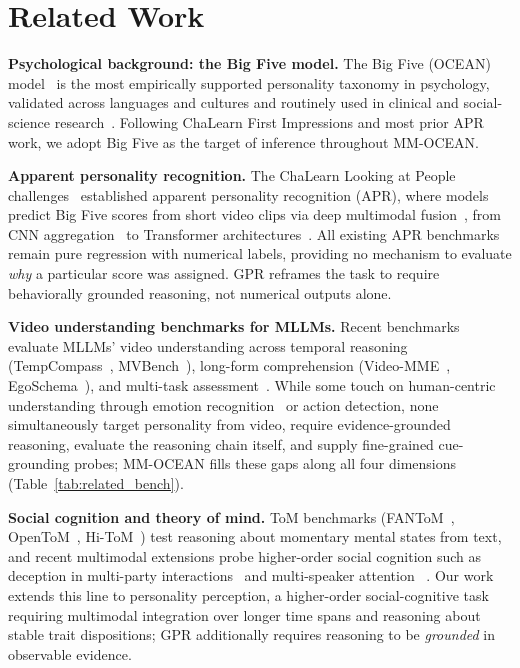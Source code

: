 \documentclass{article}
\newcommand{\taskabbr}{GPR}
\newcommand{\benchname}{MM-OCEAN}
\begin{document}
\vspace{-0.2cm}
\section{Related Work}
\label{sec:related}

\vspace{-0.2cm}

\noindent\textbf{Psychological background: the Big Five model.}
The Big Five (OCEAN) model~\cite{mccrae1987validation,john2008paradigm} is the most empirically supported personality taxonomy in psychology, validated across languages and cultures and routinely used in clinical and social-science research~\cite{barrick1991bigfive}. Following ChaLearn First Impressions and most prior APR work, we adopt Big Five as the target of inference throughout \benchname{}.

\noindent\textbf{Apparent personality recognition.}
The ChaLearn Looking at People challenges~\cite{ponce2016chalearn,escalante2020modeling} established apparent personality recognition (APR), where models predict Big Five scores from short video clips via deep multimodal fusion~\cite{guclu2016deep}, from CNN aggregation~\cite{guclu2016deep} to Transformer architectures~\cite{saberi2026transformer}. All existing APR benchmarks remain pure regression with numerical labels, providing no mechanism to evaluate \emph{why} a particular score was assigned. \taskabbr{} reframes the task to require behaviorally grounded reasoning, not numerical outputs alone.

\noindent\textbf{Video understanding benchmarks for MLLMs.}
Recent benchmarks evaluate MLLMs' video understanding across temporal reasoning (TempCompass~\cite{liu2024tempcompass}, MVBench~\cite{li2024mvbench}), long-form comprehension (Video-MME~\cite{fu2024videomme}, EgoSchema~\cite{mangalam2023egoschema}), and multi-task assessment~\cite{fang2024mmbench}. While some touch on human-centric understanding through emotion recognition~\cite{poria2019meld} or action detection, none simultaneously target personality from video, require evidence-grounded reasoning, evaluate the reasoning chain itself, and supply fine-grained cue-grounding probes; \benchname{} fills these gaps along all four dimensions (Table~\ref{tab:related_bench}).

\noindent\textbf{Social cognition and theory of mind.}
ToM benchmarks (FANToM~\cite{kim2023fantom}, OpenToM~\cite{xu2024opentom}, Hi-ToM~\cite{wu2023hitom}) test reasoning about momentary mental states from text, and recent multimodal extensions probe higher-order social cognition such as deception in multi-party interactions~\cite{kang2025can} and multi-speaker attention ~\cite{ouyang2025multi,ouyang2026socialdirector}. 
Our work extends this line to personality perception, a higher-order social-cognitive task requiring multimodal integration over longer time spans and reasoning about stable trait dispositions; \taskabbr{} additionally requires reasoning to be \emph{grounded} in observable evidence.
\vspace{-0.2cm}
\end{document}
